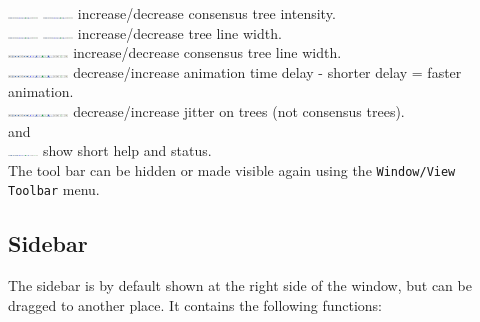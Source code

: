 \documentclass{article}
\begin{document}
\includegraphics[width=8mm,viewport=237 0 265 28,clip]{toolbar.png} 
\includegraphics[width=8mm,viewport=265 0 290 28,clip]{toolbar.png} increase/decrease consensus tree intensity.\\
\includegraphics[width=8mm,viewport=290 0 320 28,clip]{toolbar.png} 
\includegraphics[width=8mm,viewport=320 0 345 28,clip]{toolbar.png} increase/decrease tree line width.\\
\includegraphics[width=16mm,viewport=345 0 398 28,clip]{toolbar.png} increase/decrease consensus tree line width.\\
\includegraphics[width=16mm,viewport=398 0 448 28,clip]{toolbar.png} decrease/increase animation time delay - shorter delay = faster animation.\\
\includegraphics[width=16mm,viewport=448 0 495 28,clip]{toolbar.png} decrease/increase jitter on trees (not consensus trees).\\
and\\
\includegraphics[width=8mm,viewport=495 0 525 28,clip]{toolbar.png} show short help and status.\\

The tool bar can be hidden or made visible again using the {\tt Window/View Toolbar} menu.

\subsection{Sidebar}
The sidebar is by default shown at the right side of the window, but can be dragged to another place.
It contains the following functions:
\end{document}
